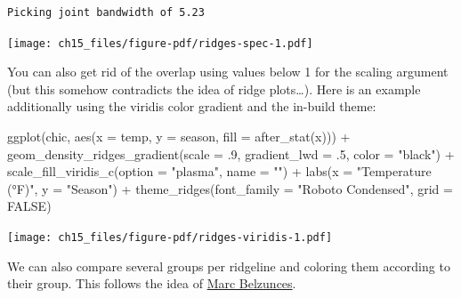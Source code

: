 \documentclass[
  letterpaper,
]{scrbook}
\newenvironment{Shaded}{\begin{snugshade}}{\end{snugshade}}
\newcommand{\AttributeTok}[1]{\textcolor[rgb]{0.40,0.45,0.13}{#1}}
\newcommand{\ConstantTok}[1]{\textcolor[rgb]{0.56,0.35,0.01}{#1}}
\newcommand{\DecValTok}[1]{\textcolor[rgb]{0.68,0.00,0.00}{#1}}
\newcommand{\FunctionTok}[1]{\textcolor[rgb]{0.28,0.35,0.67}{#1}}
\newcommand{\NormalTok}[1]{\textcolor[rgb]{0.00,0.23,0.31}{#1}}
\newcommand{\SpecialCharTok}[1]{\textcolor[rgb]{0.37,0.37,0.37}{#1}}
\newcommand{\StringTok}[1]{\textcolor[rgb]{0.13,0.47,0.30}{#1}}
\begin{document}
\begin{verbatim}
Picking joint bandwidth of 5.23
\end{verbatim}

\texttt{[image: ch15\_files/figure-pdf/ridges-spec-1.pdf]}

You can also get rid of the overlap using values below 1 for the scaling
argument (but this somehow contradicts the idea of ridge plots\ldots).
Here is an example additionally using the viridis color gradient and the
in-build theme:

\begin{Shaded}
\begin{Highlighting}[]
\FunctionTok{ggplot}\NormalTok{(chic, }\FunctionTok{aes}\NormalTok{(}\AttributeTok{x =}\NormalTok{ temp, }\AttributeTok{y =}\NormalTok{ season, }\AttributeTok{fill =} \FunctionTok{after\_stat}\NormalTok{(x))) }\SpecialCharTok{+}
  \FunctionTok{geom\_density\_ridges\_gradient}\NormalTok{(}\AttributeTok{scale =}\NormalTok{ .}\DecValTok{9}\NormalTok{, }\AttributeTok{gradient\_lwd =}\NormalTok{ .}\DecValTok{5}\NormalTok{,}
                               \AttributeTok{color =} \StringTok{"black"}\NormalTok{) }\SpecialCharTok{+}
  \FunctionTok{scale\_fill\_viridis\_c}\NormalTok{(}\AttributeTok{option =} \StringTok{"plasma"}\NormalTok{, }\AttributeTok{name =} \StringTok{""}\NormalTok{) }\SpecialCharTok{+}
  \FunctionTok{labs}\NormalTok{(}\AttributeTok{x =} \StringTok{"Temperature (°F)"}\NormalTok{, }\AttributeTok{y =} \StringTok{"Season"}\NormalTok{) }\SpecialCharTok{+}
  \FunctionTok{theme\_ridges}\NormalTok{(}\AttributeTok{font\_family =} \StringTok{"Roboto Condensed"}\NormalTok{, }\AttributeTok{grid =} \ConstantTok{FALSE}\NormalTok{)}
\end{Highlighting}
\end{Shaded}

\texttt{[image: ch15\_files/figure-pdf/ridges-viridis-1.pdf]}

We can also compare several groups per ridgeline and coloring them
according to their group. This follows the idea of
\href{https://twitter.com/marcbeldata/status/888697140268204032}{Marc
Belzunces}.
\end{document}
